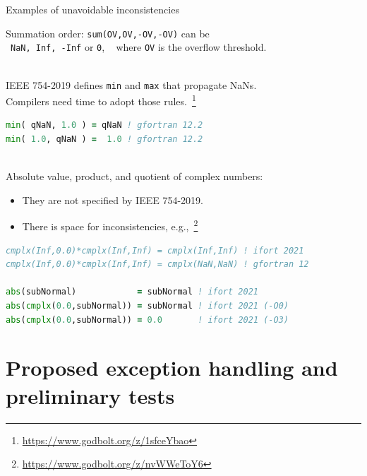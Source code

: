 \documentclass[11pt]{beamer}
\newcommand{\cpp}{{C\texttt{++}}}
\begin{document}

\begin{frame}[fragile]{Examples of unavoidable inconsistencies}

	Summation order: \texttt{sum(OV,OV,-OV,-OV)} can be\\
	~\texttt{NaN, Inf, -Inf} or \texttt{0}, ~ where \texttt{OV} is the overflow threshold.

	
	~\\
	IEEE 754-2019 defines \texttt{min} and \texttt{max} that propagate NaNs.\\
	Compilers need time to adopt those rules.~\footnote{\url{https://www.godbolt.org/z/1sfceYbao}}
	\begin{lstlisting}[language=Fortran]
min( qNaN, 1.0 ) = qNaN ! gfortran 12.2
min( 1.0, qNaN ) =  1.0 ! gfortran 12.2\end{lstlisting}
	
	~\\
	Absolute value, product, and quotient of complex numbers:
	\begin{itemize}
		\item They are not specified by IEEE 754-2019.
		\item There is space for inconsistencies, e.g.,~\footnote{\url{https://www.godbolt.org/z/nvWWeToY6}}
	\end{itemize}
	\begin{lstlisting}[language=Fortran]
cmplx(Inf,0.0)*cmplx(Inf,Inf) = cmplx(Inf,Inf) ! ifort 2021
cmplx(Inf,0.0)*cmplx(Inf,Inf) = cmplx(NaN,NaN) ! gfortran 12

abs(subNormal)            = subNormal ! ifort 2021
abs(cmplx(0.0,subNormal)) = subNormal ! ifort 2021 (-O0)
abs(cmplx(0.0,subNormal)) = 0.0       ! ifort 2021 (-O3)\end{lstlisting}

\end{frame}

\section{Proposed exception handling and preliminary tests}
\end{document}
